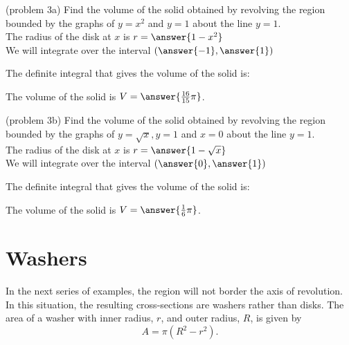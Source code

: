 \documentclass[handout]{ximera}
\begin{document}
\begin{problem}(problem 3a)
Find the volume of the solid obtained by revolving the region bounded by the graphs of $y=x^2$ and $y=1$
about the line $y = 1$.\\

The radius of the disk at $x$ is $r = \answer{1-x^2}$\\
We will integrate over the interval $\left(\answer{-1},\answer{1}\right)$

The definite integral that gives the volume of the solid is:\\
\begin{multipleChoice}
\end{multipleChoice}

The volume of the solid is $V = \answer{\frac{16}{15} \pi }$.


\end{problem}


\begin{problem}(problem 3b)
Find the volume of the solid obtained by revolving the region bounded by the graphs of $y=\sqrt x, y=1$ and $x = 0$
about the line $y=1$.\\

The radius of the disk at $x$ is $r = \answer{1-\sqrt x}$\\
We will integrate over the interval $\left(\answer{0},\answer{1}\right)$

The definite integral that gives the volume of the solid is:\\
\begin{multipleChoice}
\end{multipleChoice}

The volume of the solid is $V = \answer{\frac16 \pi }$.

\end{problem}






\section{Washers} In the next series of examples, the region will not border the axis of revolution. 
In this situation, the resulting cross-sections are washers rather than disks.
The area of a washer with inner radius, $r$, and outer radius, $R$, is given by 
\[
A = \pi(R^2 - r^2).
\]
\end{document}
